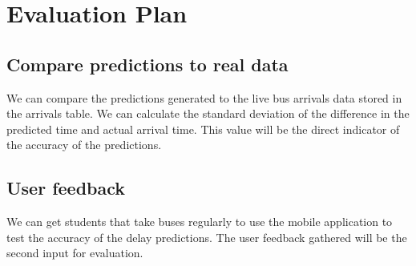 \chapter{Evaluation Plan}

\section{Compare predictions to real data}
We can compare the predictions generated to the live bus arrivals data stored in the arrivals table. We can calculate the standard deviation of the difference in the predicted time and actual arrival time. This value will be the direct indicator of the accuracy of the predictions.

\section{User feedback}
We can get students that take buses regularly to use the mobile application to test the accuracy of the delay predictions. The user feedback gathered will be the second input for evaluation.
